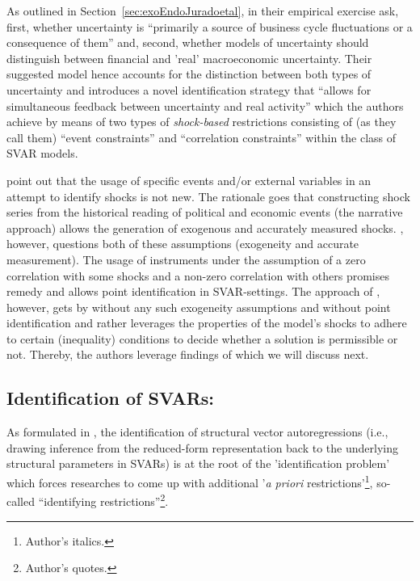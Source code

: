 \documentclass[a4paper,11pt,listof=nochaptergap,oneside,pointednumbers,bibtotoc,bigheadings,liststotoc,hidelinks]{scrbook}
\theoremstyle{mysatz}
\theoremstyle{mydefinition}
\theoremstyle{mytheorem}
\theoremstyle{mybemerkung}
\begin{document}
As outlined in Section~\ref{sec:exoEndoJuradoetal}, in their empirical exercise \citet[p. 2]{ludvigsonetal:18} ask, first, whether uncertainty is ``primarily a source of business cycle fluctuations or a consequence of them'' and, second, whether models of uncertainty should distinguish between financial and 'real' macroeconomic uncertainty. Their suggested model hence accounts for the distinction between both types of uncertainty and introduces a novel identification strategy that ``allows for simultaneous feedback between uncertainty and real activity'' which the authors achieve by means of two types of \textit{shock-based} restrictions consisting of (as they call them) ``event constraints'' and ``correlation constraints'' within the class of SVAR models. 

\citet{ludvigsonetal:18} point out that the usage of specific events and/or external variables in an attempt to identify shocks is not new. The rationale goes that constructing shock series from the historical reading of political and economic events (the narrative approach) allows the generation of exogenous and accurately measured shocks. \citet{ramey:16}, however, questions both of these assumptions (exogeneity and accurate measurement). The usage of instruments under the assumption of a zero correlation with some shocks and a non-zero correlation with others promises remedy and allows point identification in SVAR-settings. The approach of \citet{ludvigsonetal:18}, however, gets by without any such exogeneity assumptions and without point identification and rather leverages the properties of the model's shocks to adhere to certain (inequality) conditions to decide whether a solution is permissible or not. Thereby, the authors leverage findings of \citet{rubioetal:10} which we will discuss next.

	
	
\subsection{Identification of SVARs: \citet{rubioetal:10}}
\label{sec:observationalEquivalence}
As formulated in \citet{rubioetal:10}, the identification of structural vector autoregressions (i.e., drawing inference from the reduced-form representation back to the underlying structural parameters in SVARs) is at the root of the 'identification problem' which forces researches to come up with additional '\textit{a priori} restrictions'\footnote{Author's italics.}, so-called ``identifying restrictions''\footnote{Author's quotes.}.
\end{document}
